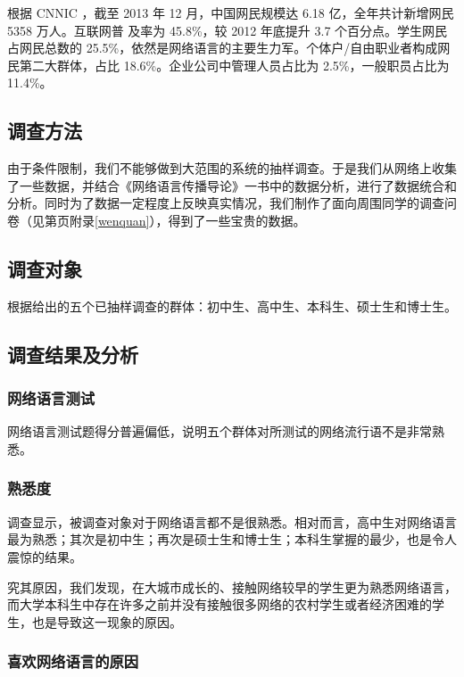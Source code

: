 根据 CNNIC \cite{cnnic}，截至 2013 年 12 月，中国网民规模达 6.18 亿，全年共计新增网民 5358 万人。互联网普
及率为 45.8\%，较 2012 年底提升 3.7 个百分点。学生网民占网民总数的 25.5\%，依然是网络语言的主要生力军。个体户/自由职业者构成网民第二大群体，占比 18.6\%。企业公司中管理人员占比为
2.5\%，一般职员占比为 11.4\%。

\subsection{调查方法}

由于条件限制，我们不能够做到大范围的系统的抽样调查。于是我们从网络上收集了一些数据，并结合《网络语言传播导论》\cite{cao}一书中的数据分析，进行了数据统合和分析。同时为了数据一定程度上反映真实情况，我们制作了面向周围同学的调查问卷（见第\pageref{wenquan}页附录\ref{wenquan}），得到了一些宝贵的数据。

\subsection{调查对象}

根据\cite{cao}给出的五个已抽样调查的群体：初中生、高中生、本科生、硕士生和博士生。

\subsection{调查结果及分析}

\subsubsection{网络语言测试}

网络语言测试题得分普遍偏低，说明五个群体对所测试的网络流行语不是非常熟悉。

\subsubsection{熟悉度}

调查显示，被调查对象对于网络语言都不是很熟悉。相对而言，高中生对网络语言最为熟悉；其次是初中生；再次是硕士生和博士生；本科生掌握的最少，也是令人震惊的结果。

究其原因，我们发现，在大城市成长的、接触网络较早的学生更为熟悉网络语言，而大学本科生中存在许多之前并没有接触很多网络的农村学生或者经济困难的学生，也是导致这一现象的原因。

\subsubsection{喜欢网络语言的原因}

